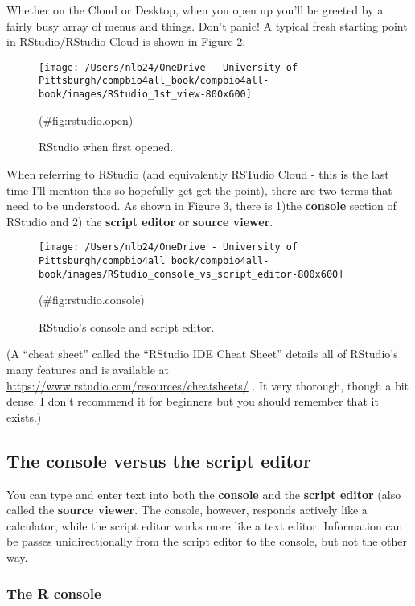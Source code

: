 \documentclass[
]{book}
\begin{document}
Whether on the Cloud or Desktop, when you open up you'll be greeted by a fairly busy array of menus and things. Don't panic! A typical fresh starting point in RStudio/RStudio Cloud is shown in Figure 2.

\begin{figure}
\texttt{[image: /Users/nlb24/OneDrive - University of Pittsburgh/compbio4all\_book/compbio4all-book/images/RStudio\_1st\_view-800x600]} \caption{RStudio when first opened.}(\#fig:rstudio.open)
\end{figure}

When referring to RStudio (and equivalently RSTudio Cloud - this is the last time I'll mention this so hopefully get get the point), there are two terms that need to be understood. As shown in Figure 3, there is 1)the \textbf{console} section of RStudio and 2) the \textbf{script editor} or \textbf{source viewer}.

\begin{figure}
\texttt{[image: /Users/nlb24/OneDrive - University of Pittsburgh/compbio4all\_book/compbio4all-book/images/RStudio\_console\_vs\_script\_editor-800x600]} \caption{RStudio's console and script editor.}(\#fig:rstudio.console)
\end{figure}

(A ``cheat sheet'' called the ``RStudio IDE Cheat Sheet'' details all of RStudio's many features and is available at \url{https://www.rstudio.com/resources/cheatsheets/} . It very thorough, though a bit dense. I don't recommend it for beginners but you should remember that it exists.)

\hypertarget{the-console-versus-the-script-editor}{%
\subsection{The console versus the script editor}\label{the-console-versus-the-script-editor}}

You can type and enter text into both the \textbf{console} and the \textbf{script editor} (also called the \textbf{source viewer}. The console, however, responds actively like a calculator, while the script editor works more like a text editor. Information can be passes unidirectionally from the script editor to the console, but not the other way.

\hypertarget{the-r-console}{%
\subsubsection{The R console}\label{the-r-console}}
\end{document}
